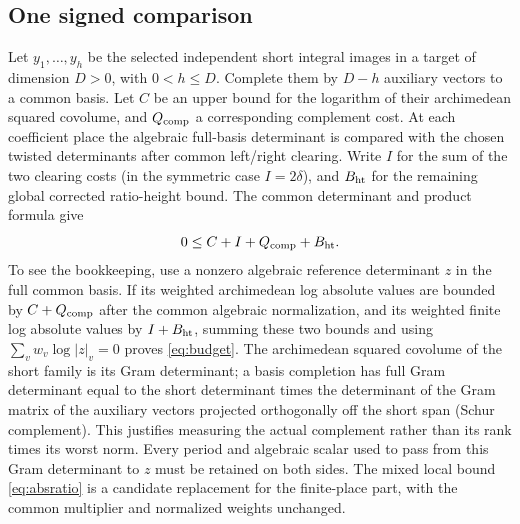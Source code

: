 \documentclass[11pt,a4paper]{article}
\begin{document}
\subsection{One signed comparison}
Let $y_1,\ldots,y_h$ be the selected independent short integral images in a target of dimension $D>0$, with $0<h\leq D$. Complete them by $D-h$ auxiliary vectors to a common basis. Let $C$ be an upper bound for the logarithm of their archimedean squared covolume, and $Q_{\rm comp}$ a corresponding complement cost. At each coefficient place the algebraic full-basis determinant is compared with the chosen twisted determinants after common left/right clearing. Write $I$ for the sum of the two clearing costs (in the symmetric case $I=2\delta$), and $B_{\rm ht}$ for the remaining global corrected ratio-height bound. The common determinant and product formula give
\begin{equation}\label{eq:budget}
0\leq C+I+Q_{\rm comp}+B_{\rm ht}.
\end{equation}
To see the bookkeeping, use a nonzero algebraic reference determinant $z$ in the full common basis. If its weighted archimedean log absolute values are bounded by $C+Q_{\rm comp}$ after the common algebraic normalization, and its weighted finite log absolute values by $I+B_{\rm ht}$, summing these two bounds and using $\sum_v w_v\log|z|_v=0$ proves \eqref{eq:budget}. The archimedean squared covolume of the short family is its Gram determinant; a basis completion has full Gram determinant equal to the short determinant times the determinant of the Gram matrix of the auxiliary vectors projected orthogonally off the short span (Schur complement). This justifies measuring the actual complement rather than its rank times its worst norm. Every period and algebraic scalar used to pass from this Gram determinant to $z$ must be retained on both sides. The mixed local bound \eqref{eq:absratio} is a candidate replacement for the finite-place part, with the common multiplier and normalized weights unchanged.
\end{document}

